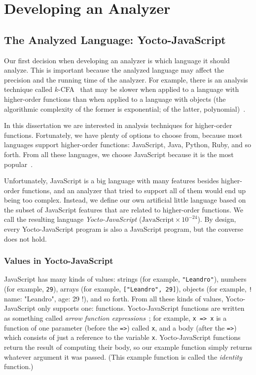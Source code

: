 \documentclass[12pt, oneside]{book}
\begin{document}
\chapter{Developing an Analyzer}


\section{The Analyzed Language: Yocto-JavaScript}
\label{the-analyzed-language-yocto-javascript}

Our first decision when developing an analyzer is which language it should analyze. This is important because the analyzed language may affect the precision and the running time of the analyzer. For example, there is an analysis technique called $k$-CFA~\cite{k-cfa} that may be slower when applied to a language with higher-order functions than when applied to a language with objects (the algorithmic complexity of the former is exponential; of the latter, polynomial)~\cite{m-cfa}.

In this dissertation we are interested in analysis techniques for higher-order functions. Fortunately, we have plenty of options to choose from, because most languages support higher-order functions: JavaScript, Java, Python, Ruby, and so forth. From all these languages, we choose JavaScript because it is the most popular~\cite{stack-overflow-developer-survey, jet-brains-developer-survey}.

Unfortunately, JavaScript is a big language with many features besides higher-order functions, and an analyzer that tried to support all of them would end up being too complex. Instead, we define our own artificial little language based on the subset of JavaScript features that are related to higher-order functions. We call the resulting language \emph{Yocto-JavaScript} ($\mathrm{JavaScript} \times 10^{-24}$). By design, every Yocto-JavaScript program is also a JavaScript program, but the converse does not hold.

\subsection{Values in Yocto-JavaScript}

JavaScript has many kinds of values: strings (for example, \texttt{"Leandro"}), numbers (for example, \texttt{29}), arrays (for example, \texttt{["Leandro", 29]}), objects (for example, \texttt!{ name: "Leandro", age: 29 }!), and so forth. From all these kinds of values, Yocto-JavaScript only supports one: functions. Yocto-JavaScript functions are written as something called \emph{arrow function expressions}~\cite{arrow-function-expressions}; for example, \texttt{x => x} is a function of one parameter (before the \texttt{=>}) called \texttt{x}, and a body (after the \texttt{=>}) which consists of just a reference to the variable \texttt{x}. Yocto-JavaScript functions return the result of computing their body, so our example function simply returns whatever argument it was passed. (This example function is called the \emph{identity} function.)
\end{document}
